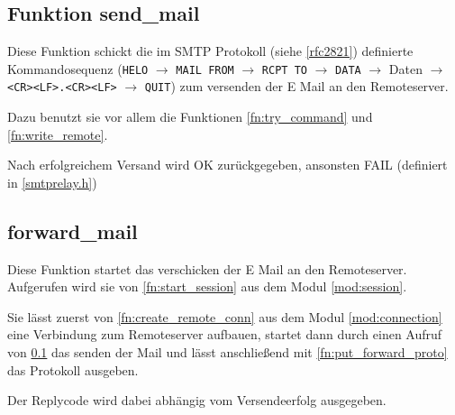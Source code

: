 \documentclass[pdftex,final,a4paper,10pt,notitlepage,halfparskip]{scrreprt}
\begin{document}
\subsection{Funktion send\_mail}\label{fn:send_mail}
Diese Funktion schickt die im SMTP Protokoll (siehe \ref{rfc2821}) definierte Kommandosequenz (\texttt{HELO} $\rightarrow$ \texttt{MAIL FROM} $\rightarrow$ \texttt{RCPT TO} $\rightarrow$ \texttt{DATA} $\rightarrow$ Daten $\rightarrow$ \texttt{<CR><LF>.<CR><LF>} $\rightarrow$ \texttt{QUIT}) zum versenden der E Mail an den Remoteserver.

Dazu benutzt sie vor allem die Funktionen \ref{fn:try_command} und \ref{fn:write_remote}.

Nach erfolgreichem Versand wird OK zurückgegeben, ansonsten FAIL (definiert in \ref{smtprelay.h})

\subsection{forward\_mail}\label{forward_mail}
Diese Funktion startet das verschicken der E Mail an den Remoteserver. Aufgerufen wird sie von \ref{fn:start_session} aus dem Modul \ref{mod:session}.

Sie lässt zuerst von \ref{fn:create_remote_conn} aus dem Modul \ref{mod:connection} eine Verbindung zum Remoteserver aufbauen, startet dann durch einen Aufruf von \ref{fn:send_mail} das senden der Mail und lässt anschließend mit \ref{fn:put_forward_proto} das Protokoll ausgeben. 

Der Replycode wird dabei abhängig vom Versendeerfolg ausgegeben.
\end{document}
